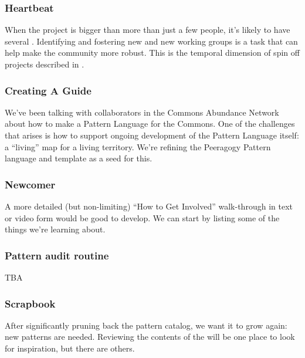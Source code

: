 \subsubsection*{Heartbeat} When the project is bigger than more than just a few people, it's likely to have several .  Identifying and fostering new  and new working groups is a task that can help make the community more robust.  This is the temporal dimension of spin off projects described in .

\subsubsection*{Creating A Guide} We’ve been talking with collaborators in the Commons Abundance Network
about how to make a Pattern Language for the Commons. One of the
challenges that arises is how to support ongoing development of the
Pattern Language itself: a “living” map for a living territory. We’re
refining the Peeragogy Pattern language and template as a seed for this.

\subsubsection*{Newcomer} A more detailed (but non-limiting) ``How to Get Involved'' walk-through in text or video form would be good to develop. We can start by listing some of the things we're learning about.

\subsubsection*{Pattern audit routine}  TBA

\subsubsection*{Scrapbook} After significantly pruning back the pattern catalog, we want it to grow again: new patterns are needed.  Reviewing the contents of the  will be one place to look for inspiration, but there are others.



